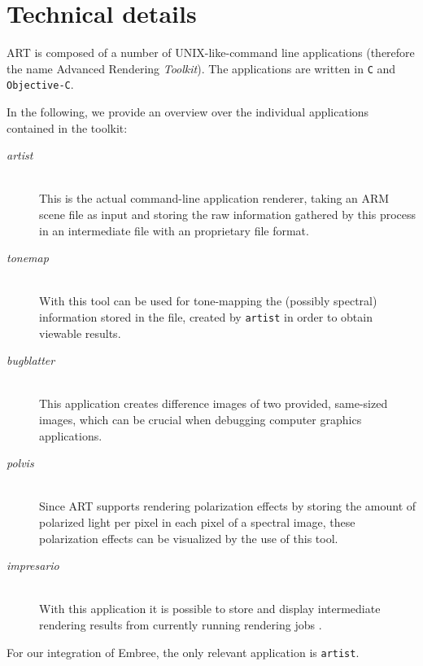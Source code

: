 \section{Technical details}
ART	is composed of a number of UNIX-like-command line applications (therefore the name Advanced Rendering \emph{Toolkit}). The applications are written in \texttt{C} and \texttt{Objective-C}. 

In the following, we provide an overview over the individual applications contained in the toolkit:
\begin{description}
	\item[\emph{artist}] \hfil \\ This is the actual command-line application renderer, taking an ARM scene file as input and storing the raw information  gathered by this process in an intermediate file with an proprietary file format.
	\item[\emph{tonemap}] \hfil \\ With this tool can be used for tone-mapping the (possibly spectral) information stored in the file, created by \texttt{artist} in order to obtain viewable results.
	\item[\emph{bugblatter}] \hfil \\ This application creates difference images of two provided, same-sized images, which can be crucial when debugging computer graphics applications.
	\item[\emph{polvis}] \hfil \\ Since ART supports rendering polarization effects by storing the amount of polarized light per pixel in each pixel of a spectral image, these polarization effects can be visualized by the use of this tool.
	\item[\emph{impresario}] \hfil \\ With this application it is possible to store and display intermediate rendering results from currently running rendering jobs .
\end{description}

For our integration of Embree, the only relevant application is \texttt{artist}. 

